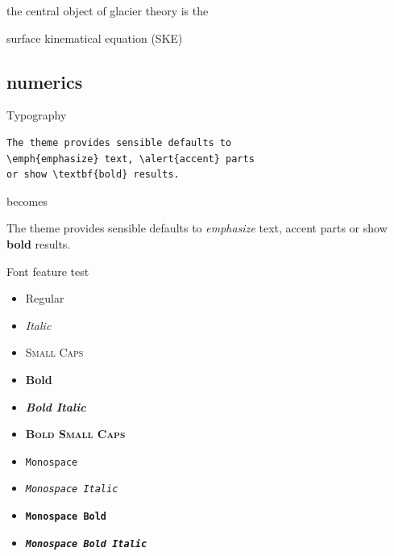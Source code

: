\documentclass[10pt,dvipsnames]{beamer}
\begin{document}
\begin{frame}[standout]
the central object of glacier theory is the

surface kinematical equation (SKE)
\end{frame}


\subsection{numerics}



\begin{frame}[fragile]{Typography}
      \begin{verbatim}The theme provides sensible defaults to
\emph{emphasize} text, \alert{accent} parts
or show \textbf{bold} results.\end{verbatim}

  \begin{center}becomes\end{center}

  The theme provides sensible defaults to \emph{emphasize} text,
  \alert{accent} parts or show \textbf{bold} results.
\end{frame}

\begin{frame}{Font feature test}
  \begin{itemize}
    \item Regular
    \item \textit{Italic}
    \item \textsc{Small Caps}
    \item \textbf{Bold}
    \item \textbf{\textit{Bold Italic}}
    \item \textbf{\textsc{Bold Small Caps}}
    \item \texttt{Monospace}
    \item \texttt{\textit{Monospace Italic}}
    \item \texttt{\textbf{Monospace Bold}}
    \item \texttt{\textbf{\textit{Monospace Bold Italic}}}
  \end{itemize}
\end{frame}
\end{document}
